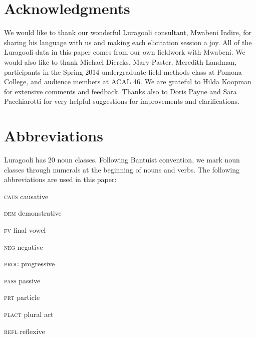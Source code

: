 \documentclass[output=paper]{langsci/langscibook}
\begin{document}
\section*{Acknowledgments}

We would like to thank our wonderful Luragooli consultant, Mwabeni Indire, for sharing his language with us and making each elicitation session a joy. All of the Luragooli data in this paper comes from our own fieldwork with Mwabeni. We would also like to thank Michael Diercks, Mary Paster, Meredith Landman, participants in the Spring 2014 undergraduate field methods class at Pomona College, and audience members at ACAL 46. We are grateful to Hilda Koopman for extensive comments and feedback. Thanks also to Doris Payne and Sara Pacchiarotti for very helpful suggestions for improvements and clarifications.

\section*{Abbreviations}

Luragooli has 20 noun classes. Following Bantuist convention, we mark noun classes through numerals at the beginning of nouns and verbs. The following abbreviations are used in this paper: 

\textsc{caus}     causative 

\textsc{dem}     demonstrative 

\textsc{fv}     final vowel

\textsc{neg}     negative   

\textsc{prog}     progressive 

\textsc{pass}     passive 

\textsc{prt}     particle   

\textsc{plact   }plural act 

\textsc{refl}     reflexive
\end{document}

